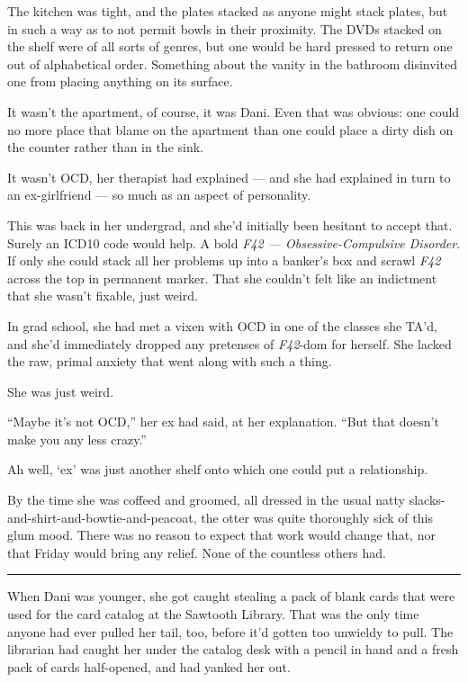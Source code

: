 The kitchen was tight, and the plates stacked as anyone might stack plates, but in such a way as to not permit bowls in their proximity. The DVDs stacked on the shelf were of all sorts of genres, but one would be hard pressed to return one out of alphabetical order. Something about the vanity in the bathroom disinvited one from placing anything on its surface.

It wasn't the apartment, of course, it was Dani. Even that was obvious: one could no more place that blame on the apartment than one could place a dirty dish on the counter rather than in the sink.

It wasn't OCD, her therapist had explained --- and she had explained in turn to an ex-girlfriend --- so much as an aspect of personality.

This was back in her undergrad, and she'd initially been hesitant to accept that. Surely an ICD10 code would help. A bold \emph{F42 --- Obsessive-Compulsive Disorder}. If only she could stack all her problems up into a banker's box and scrawl \emph{F42} across the top in permanent marker. That she couldn't felt like an indictment that she wasn't fixable, just weird.

In grad school, she had met a vixen with OCD in one of the classes she TA'd, and she'd immediately dropped any pretenses of \emph{F42}-dom for herself. She lacked the raw, primal anxiety that went along with such a thing.

She was just weird.

``Maybe it's not OCD,'' her ex had said, at her explanation. ``But that doesn't make you any less crazy.''

Ah well, `ex' was just another shelf onto which one could put a relationship.

By the time she was coffeed and groomed, all dressed in the usual natty slacks-and-shirt-and-bowtie-and-peacoat, the otter was quite thoroughly sick of this glum mood. There was no reason to expect that work would change that, nor that Friday would bring any relief. None of the countless others had.

\begin{center}\rule{0.5\linewidth}{\linethickness}\end{center}

When Dani was younger, she got caught stealing a pack of blank cards that were used for the card catalog at the Sawtooth Library. That was the only time anyone had ever pulled her tail, too, before it'd gotten too unwieldy to pull. The librarian had caught her under the catalog desk with a pencil in hand and a fresh pack of cards half-opened, and had yanked her out.

